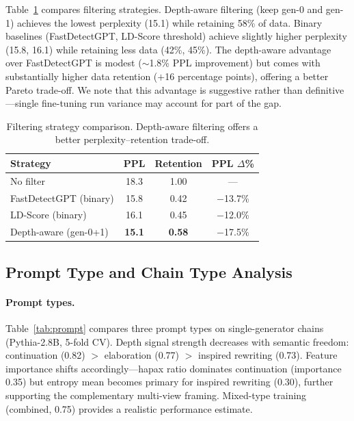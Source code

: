 \documentclass[letterpaper,11pt]{article}
\begin{document}
Table~\ref{tab:filtering} compares filtering strategies. Depth-aware filtering (keep gen-0 and gen-1) achieves the lowest perplexity (15.1) while retaining 58\% of data. Binary baselines (FastDetectGPT, LD-Score threshold) achieve slightly higher perplexity (15.8, 16.1) while retaining less data (42\%, 45\%). The depth-aware advantage over FastDetectGPT is modest ($\sim$1.8\% PPL improvement) but comes with substantially higher data retention ($+$16 percentage points), offering a better Pareto trade-off. We note that this advantage is suggestive rather than definitive---single fine-tuning run variance may account for part of the gap.

\begin{table}[t]
\centering
\caption{Filtering strategy comparison. Depth-aware filtering offers a better perplexity--retention trade-off.}
\label{tab:filtering}
\small
\begin{tabular}{lccc}
\toprule
Strategy & PPL & Retention & PPL $\Delta$\% \\
\midrule
No filter & 18.3 & 1.00 & --- \\
FastDetectGPT (binary) & 15.8 & 0.42 & $-$13.7\% \\
LD-Score (binary) & 16.1 & 0.45 & $-$12.0\% \\
Depth-aware (gen-0+1) & \textbf{15.1} & \textbf{0.58} & $-$17.5\% \\
\bottomrule
\end{tabular}
\end{table}

\subsection{Prompt Type and Chain Type Analysis}
\label{sec:prompt}

\paragraph{Prompt types.} Table~\ref{tab:prompt} compares three prompt types on single-generator chains (Pythia-2.8B, 5-fold CV). Depth signal strength decreases with semantic freedom: continuation (0.82) $>$ elaboration (0.77) $>$ inspired rewriting (0.73). Feature importance shifts accordingly---hapax ratio dominates continuation (importance 0.35) but entropy mean becomes primary for inspired rewriting (0.30), further supporting the complementary multi-view framing. Mixed-type training (combined, 0.75) provides a realistic performance estimate.
\end{document}
